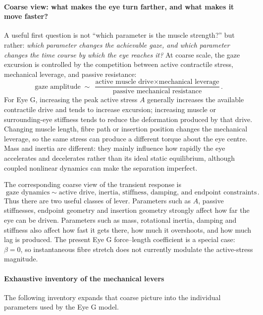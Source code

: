 \documentclass[11pt]{article}
\begin{document}
\paragraph{Coarse view: what makes the eye turn farther, and what makes it move faster?}
A useful first question is not ``which parameter is the muscle strength?'' but rather: \emph{which parameter changes the achievable gaze, and which parameter changes the time course by which the eye reaches it?} At coarse scale, the gaze excursion is controlled by the competition between active contractile stress, mechanical leverage, and passive resistance:
\begin{equation}
\boxed{\text{gaze amplitude}\;\sim\;\frac{\text{active muscle drive}\times\text{mechanical leverage}}{\text{passive mechanical resistance}}}.
\label{eq:gaze-amplitude-levers}
\end{equation}
For Eye G, increasing the peak active stress $A$ generally increases the available contractile drive and tends to increase excursion; increasing muscle or surrounding-eye stiffness tends to reduce the deformation produced by that drive. Changing muscle length, fibre path or insertion position changes the mechanical leverage, so the same stress can produce a different torque about the eye centre. Mass and inertia are different: they mainly influence how rapidly the eye accelerates and decelerates rather than its ideal static equilibrium, although coupled nonlinear dynamics can make the separation imperfect.

The corresponding coarse view of the transient response is
\begin{equation}
\boxed{\text{gaze dynamics}\;\sim\;\text{active drive, inertia, stiffness, damping, and endpoint constraints}}.
\label{eq:gaze-dynamics-levers}
\end{equation}
Thus there are two useful classes of lever. Parameters such as $A$, passive stiffnesses, endpoint geometry and insertion geometry strongly affect how far the eye can be driven. Parameters such as mass, rotational inertia, damping and stiffness also affect how fast it gets there, how much it overshoots, and how much lag is produced. The present Eye G force--length coefficient is a special case: $\beta=0$, so instantaneous fibre stretch does not currently modulate the active-stress magnitude.

\paragraph{Exhaustive inventory of the mechanical levers}
The following inventory expands that coarse picture into the individual parameters used by the Eye G model.
\end{document}
